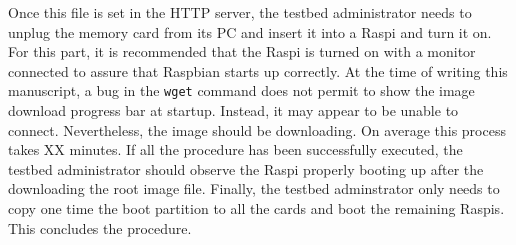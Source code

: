 Once this file is set in the \ac{HTTP} server, the testbed
administrator needs to unplug the memory card from its \ac{PC} and insert
it into a \ac{Raspi} and turn it on. For this part, it is recommended that the
\ac{Raspi} is turned on with a monitor connected to assure that Raspbian
starts up correctly. At the time of writing this manuscript, a bug in
the \texttt{wget} command does not permit to show the image download progress
bar at startup. Instead, it may appear to be unable to connect.
Nevertheless, the image should be downloading. On average this process takes
XX minutes. If all the procedure has been successfully executed,
the testbed administrator should observe the \ac{Raspi} properly booting up
after the downloading the root image file. Finally, the testbed adminstrator
only needs to copy one time the boot partition to all the cards and
boot the remaining \ac{Raspi}s. This concludes the procedure.



